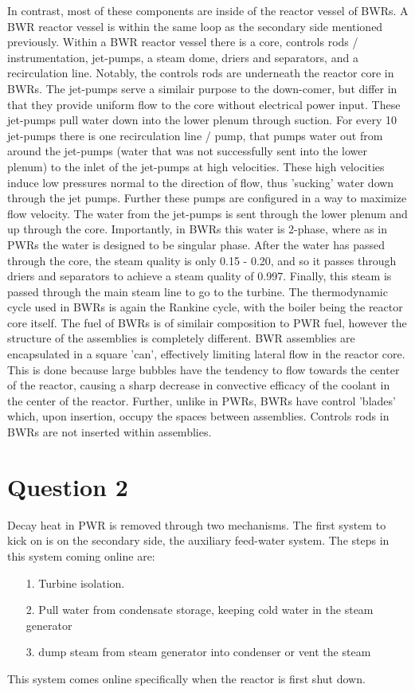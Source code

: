 \documentclass{article}
\begin{document}
In contrast, most of these components are inside of the reactor vessel of BWRs. A BWR reactor vessel is within the same loop as the secondary side mentioned previously. Within a BWR reactor vessel there is a core, controls rods / instrumentation, jet-pumps, a steam dome, driers and separators, and a recirculation line. Notably, the controls rods are underneath the reactor core in BWRs. The jet-pumps serve a similair purpose to the down-comer, but differ in that they provide uniform flow to the core without electrical power input. These jet-pumps pull water down into the lower plenum through suction. For every 10 jet-pumps there is one recirculation line / pump, that pumps water out from around the jet-pumps (water that was not successfully sent into the lower plenum) to the inlet of the jet-pumps at high velocities. These high velocities induce low pressures normal to the direction of flow, thus 'sucking' water down through the jet pumps. Further these pumps are configured in a way to maximize flow velocity. The water from the jet-pumps is sent through the lower plenum and up through the core. Importantly, in BWRs this water is 2-phase, where as in PWRs the water is designed to be singular phase. After the water has passed through the core, the steam quality is only 0.15 - 0.20, and so it passes through driers and separators to achieve a steam quality of 0.997. Finally, this steam is passed through the main steam line to go to the turbine. The thermodynamic cycle used in BWRs is again the Rankine cycle, with the boiler being the reactor core itself. The fuel of BWRs is of similair composition to PWR fuel, however the structure of the assemblies is completely different. BWR assemblies are encapsulated in a square 'can', effectively limiting lateral flow in the reactor core. This is done because large bubbles have the tendency to flow towards the center of the reactor, causing a sharp decrease in convective efficacy of the coolant in the center of the reactor. Further, unlike in PWRs, BWRs have control 'blades' which, upon insertion, occupy the spaces between assemblies. Controls rods in BWRs are not inserted within assemblies. 

\section{Question 2}

Decay heat in PWR is removed through two mechanisms. The first system to kick on is on the secondary side, the auxiliary feed-water system. The steps in this system coming online are:
\begin{itemize}
    \item[1.] Turbine isolation. 
    \item [2.] Pull water from condensate storage, keeping cold water in the steam generator
    \item[3.] dump steam from steam generator into condenser or vent the steam
\end{itemize}
This system comes online specifically when the reactor is first shut down. 
\end{document}
